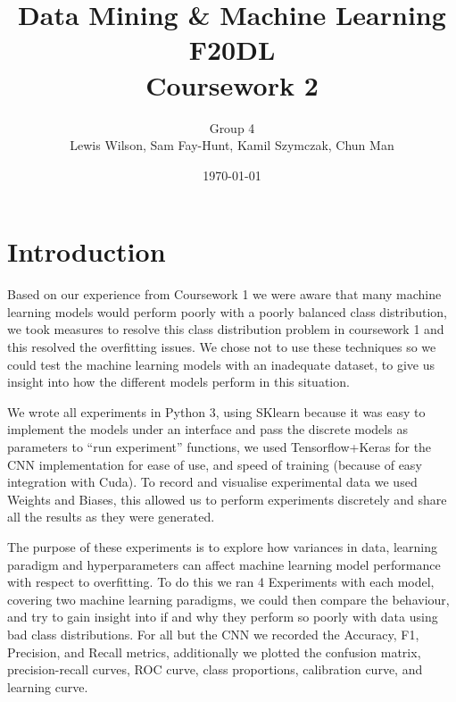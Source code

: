 \documentclass[11pt]{article}
\begin{document}
\title{\huge Data Mining \& Machine Learning F20DL \\ Coursework 2} 
\author{Group 4\\Lewis Wilson, Sam Fay-Hunt, Kamil Szymczak, Chun Man }
\date{\today}
\maketitle

\newpage
\tableofcontents
\thispagestyle{empty}
\pagebreak
\setcounter{page}{1}
\newpage
\section{Introduction}
Based on our experience from Coursework 1 we were aware that many machine learning models would perform poorly with a poorly balanced class distribution, we took measures to resolve this class distribution problem in coursework 1 and this resolved the overfitting issues.
We chose not to use these techniques so we could test the machine learning models with an inadequate dataset, to give us insight into how the different models perform in this situation.

We wrote all experiments in Python 3, using SKlearn because it was easy to implement the models under an interface and pass the discrete models as parameters to “run experiment” functions, we used Tensorflow+Keras for the CNN implementation for ease of use, and speed of training (because of easy integration with Cuda). 
To record and visualise experimental data we used Weights and Biases, this allowed us to perform experiments discretely and share all the results as they were generated.\cite{WeightsBiases}

The purpose of these experiments is to explore how variances in data, learning paradigm and hyperparameters can affect machine learning model performance with respect to overfitting. 
To do this we ran 4 Experiments with each model, covering two machine learning paradigms, we could then compare the behaviour, and try to gain insight into if and why they perform so poorly with data using bad class distributions.
For all but the CNN we recorded the Accuracy, F1, Precision, and Recall metrics, additionally we plotted the confusion matrix, precision-recall curves, ROC curve, class proportions, calibration curve, and learning curve. \cite{WeightsBiases}
\end{document}
